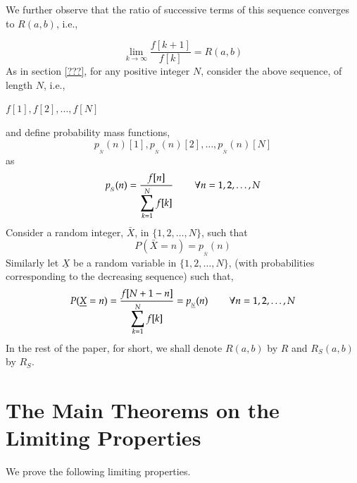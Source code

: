 \begin{multicols}{2}
\vspace{-.6cm}

We further observe that the ratio of successive terms of this sequence converges to $R(a,b)$, i.e.,

\vspace{-.3cm}

\begin{equation}
\lim_{k \rightarrow \infty} \frac{f[k+1]}{f[k]} = R(a,b)\label{eq-3.5}
\end{equation}
As in section \ref{???}, for any positive integer $N$, consider the above sequence, of length $N$, i.e.,
\begin{center}
$f[1],f[2], \ldots, f[N]$
\end{center} 

\vspace{-.3cm}

and define probability mass functions,
$$
p_{_{\bar{N}}}(n)[1],p_{_{\bar{N}}}(n)[2], \ldots, p_{_{\bar{N}}}(n)[N]
$$
as
\begin{equation}
 p_{_{\bar{N}}}(n) = \frac{f[n]}{\displaystyle{\sum_{k =1}^N f[k]}} \hspace{0.3in} \forall n = 1, 2, \ldots, N\label{eq-3.6}
\end{equation}
Consider a random integer, $\bar{X}$, in $\{1,2, \ldots, N\}$, such that
\begin{equation}
P(\bar{X} = n) = p_{_{\bar{N}}}(n)\label{eq-3.7}
\end{equation} 
Similarly let $\underline{X}$ be a random variable in $\{1,2, \ldots, N\}$, (with probabilities corresponding to the decreasing sequence) such that, 
\begin{equation}
P(\underline{X} = n) = \frac{f[N+1-n]}{\displaystyle{\sum_{k =1}^N f[k]}} = p_{_{\underline{N}}}(n) \hspace{0.3in} \forall n = 1, 2, \ldots, N\label{eq-3.8}
\end{equation} 
 In the rest of the paper, for short, we shall denote $R(a,b)$ by $R$ and $R_S(a,b)$ by $R_S$.
 
 \vspace{-.2cm}
 
\section{The Main Theorems on the\\ Limiting Properties}\label{section-4} 

We prove the following limiting properties.


\end{multicols}

